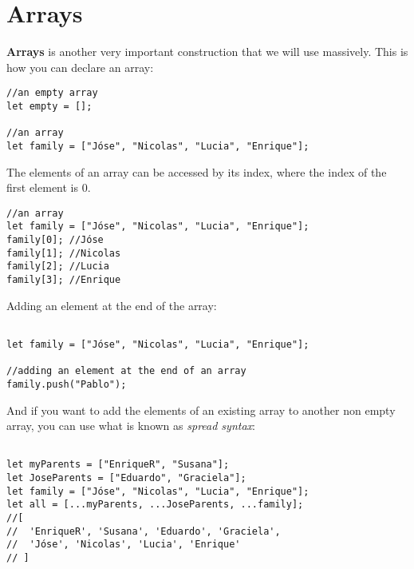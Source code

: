 \documentclass[a4paper, oneside, titlepage, 12pt]{book}
\begin{document}
\section{Arrays} \label{arrays}

\textbf{Arrays} is another very important construction that we will use massively. This is how you can declare an array:

\begin{verbatim}
//an empty array
let empty = [];

//an array
let family = ["Jóse", "Nicolas", "Lucia", "Enrique"];
\end{verbatim}

The elements of an array can be accessed by its index, where the index of the first element is 0.

\begin{verbatim}
//an array
let family = ["Jóse", "Nicolas", "Lucia", "Enrique"];
family[0]; //Jóse
family[1]; //Nicolas
family[2]; //Lucia
family[3]; //Enrique
\end{verbatim}

Adding an element at the end of the array:

\begin{verbatim}

let family = ["Jóse", "Nicolas", "Lucia", "Enrique"];

//adding an element at the end of an array
family.push("Pablo");
\end{verbatim}

And if you want to add the elements of an existing array to another non empty array, you can use what is known as \textit{spread syntax}:

\begin{verbatim}

let myParents = ["EnriqueR", "Susana"];
let JoseParents = ["Eduardo", "Graciela"];
let family = ["Jóse", "Nicolas", "Lucia", "Enrique"];
let all = [...myParents, ...JoseParents, ...family];
//[
//  'EnriqueR', 'Susana', 'Eduardo', 'Graciela', 
//  'Jóse', 'Nicolas', 'Lucia', 'Enrique'
// ]
\end{verbatim}
\end{document}
